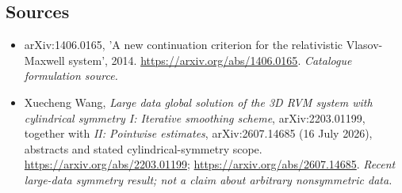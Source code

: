 \documentclass[11pt,a4paper]{article}
\begin{document}
\subsection{Sources}
\begin{itemize}\raggedright
\item[\textnormal{[S1]}]\hypertarget{source:statement:1}{} arXiv:1406.0165, 'A new continuation criterion for the relativistic Vlasov-Maxwell system', 2014.
\url{https://arxiv.org/abs/1406.0165}.
{\small\textit{Catalogue formulation source.}}
\item[\textnormal{[E1]}]\hypertarget{extra:statement:1}{} Xuecheng Wang,
\emph{Large data global solution of the 3D RVM system with cylindrical symmetry I:
Iterative smoothing scheme}, arXiv:2203.01199, together with
\emph{II: Pointwise estimates}, arXiv:2607.14685 (16 July 2026), abstracts
and stated cylindrical-symmetry scope.
\url{https://arxiv.org/abs/2203.01199};
\url{https://arxiv.org/abs/2607.14685}.
{\small\textit{Recent large-data symmetry result; not a claim about arbitrary nonsymmetric data.}}
\end{itemize}
\end{document}
